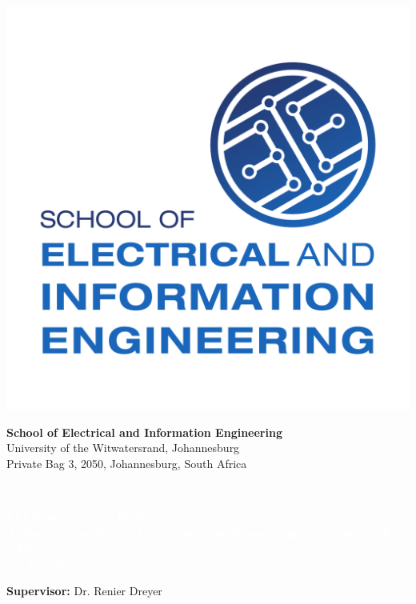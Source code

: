 \documentclass[11pt]{witseiepaper}
\begin{document}
\begin{bibunit}[witseie]


\thispagestyle{empty}
\pagestyle{plain}
\onecolumn
\begin{minipage}{0.16\textwidth}
    \includegraphics[width=\textwidth,height=\textwidth]{logo.pdf}
\end{minipage}
\begin{minipage}{0.8\textwidth}
    \centering
    \textbf{\Large School of Electrical and Information Engineering}\\
    {\large University of the Witwatersrand, Johannesburg}\\
    {\small Private Bag 3, 2050, Johannesburg, South Africa}\\
\end{minipage}
\vspace{.3cm}\\
\colorbox{myblue}{\begin{minipage}{0.98\textwidth}
        \begin{center}
        	\centering
            \textcolor{white}{\textbf{\Large{ELEN4000: Design Project}}\\
                \textbf{Antenna Array Design to map man made space “junk” in low earth orbit}\\
                October 2018
            }
        \end{center}
    \end{minipage}
}
\vspace{3cm}
\begin{center}
\textbf{Supervisor:} Dr. Renier Dreyer\\


\end{center}
\end{bibunit}
\end{document}
